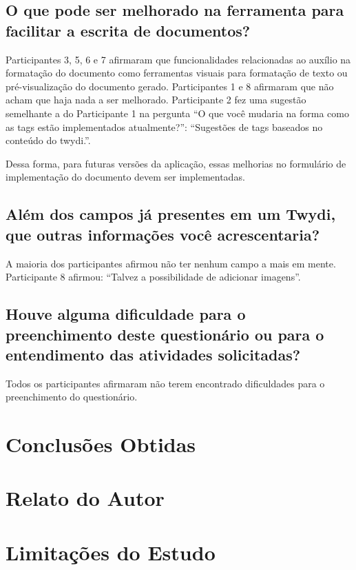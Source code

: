\subsection{O que pode ser melhorado na ferramenta para facilitar a escrita de documentos?}

Participantes 3, 5, 6 e 7 afirmaram que funcionalidades relacionadas ao auxílio na formatação do documento como ferramentas visuais para formatação de texto ou pré-visualização do documento gerado. Participantes 1 e 8 afirmaram que não acham que haja nada a ser melhorado. Participante 2 fez uma sugestão semelhante a do Participante 1 na pergunta ``O que você mudaria na forma como as tags estão implementados atualmente?'': ``Sugestões de tags baseados no conteúdo do twydi.''.

Dessa forma, para futuras versões da aplicação, essas melhorias no formulário de implementação do documento devem ser implementadas.

\subsection{Além dos campos já presentes em um Twydi, que outras informações você acrescentaria?}

A maioria dos participantes afirmou não ter nenhum campo a mais em mente. Participante 8 afirmou: ``Talvez a possibilidade de adicionar imagens''.

\subsection{Houve alguma dificuldade para o preenchimento deste questionário ou para o entendimento das atividades solicitadas?}

Todos os participantes afirmaram não terem encontrado dificuldades para o preenchimento do questionário.

\section{Conclusões Obtidas}

\section{Relato do Autor}

\section{Limitações do Estudo}

